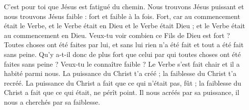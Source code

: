 C’est pour toi que Jésus est fatigué du chemin. Nous trouvons Jésus puissant et nous trouvons Jésus faible : fort et faible à la fois. Fort, car au commencement était le Verbe, et le Verbe était en Dieu et le Verbe était Dieu ; et le Verbe était au commencement en Dieu. Veux-tu voir combien ce Fils de Dieu est fort ? Toutes choses ont été faites par lui, et sans lui rien n’a été fait et tout a été fait sans peine. Qu’y a-t-il donc de plus fort que celui par qui toutes choses ont été faites sans peine ? Veux-tu le connaître faible ? Le Verbe s’est fait chair et il a habité parmi nous. La puissance du Christ t’a créé ; la faiblesse du Christ t’a recréé. La puissance du Christ a fait que ce qui n’était pas, fût ; la faiblesse du Christ a fait que ce qui était, ne pérît point. Il nous acréés par sa puissance, il nous a cherchés par sa faiblesse.
